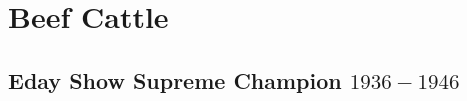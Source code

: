 \chapter{Beef Cattle}
\section[Supreme Champion]{Eday Show Supreme Champion $1936 - 1946$}
\small

\normalsize
